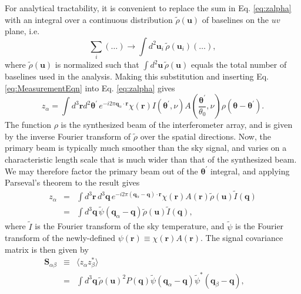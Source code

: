 \documentclass[twocolumn,aps,prd,nofootinbib,showpacs]{revtex4-1}
\begin{document}
For analytical tractability, it is convenient to replace the sum in Eq. \eqref{eq:zalpha} with an integral over a  continuous distribution $ \tilde{\rho} (\mathbf{u})$ of baselines on the $uv$ plane, i.e.
\begin{equation}
\sum_i  ( \dots ) \rightarrow \int d^2 \mathbf{u}_i \, \tilde{\rho} (\mathbf{u}_i)  ( \dots ),
\end{equation}
where $ \tilde{\rho} (\mathbf{u})$ is normalized such that $\int d^2 \mathbf{u} \, \tilde{\rho} (\mathbf{u}) $ equals the total number of baselines used in the analysis.  Making this substitution and inserting Eq. \eqref{eq:MeasurementEqn} into Eq. \eqref{eq:zalpha} gives
\begin{equation}
z_\alpha = \int d^3\mathbf{r}d^2 \boldsymbol \theta^\prime \, e^{-i 2\pi \mathbf{q}_\alpha \cdot \mathbf{r}} \chi (\mathbf{r})   I(\boldsymbol \theta^\prime, \nu) A \left(\frac{\boldsymbol \theta^\prime}{\theta_0}, \nu \right) 
\rho( \boldsymbol \theta - \boldsymbol \theta^\prime).
\end{equation}
The function $\rho$ is the synthesized beam of the interferometer array, and is given by the inverse Fourier transform of $\tilde{\rho}$ over the spatial directions.
Now, the primary beam is typically much smoother than the sky signal, and varies on a characteristic length scale that is much wider than that of the synthesized beam.  We may therefore factor the primary beam out of the $\boldsymbol \theta^\prime$ integral, and applying Parseval's theorem to the result gives
\begin{eqnarray}
z_\alpha &=& \int d^3 \mathbf{r} \,d^3 \mathbf{q}\, e^{-i 2 \pi (\mathbf{q}_\alpha - \mathbf{q}) \cdot \mathbf{r}} \chi (\mathbf{r}) A(\mathbf{r}) \tilde{\rho} (\mathbf{u}) \widetilde{I} (\mathbf{q}) \nonumber \\
&=&\int d^3 \mathbf{q}\, \widetilde{\psi}(\mathbf{q}_\alpha - \mathbf{q}) \tilde{\rho} (\mathbf{u}) \widetilde{I} (\mathbf{q}) ,
\end{eqnarray}
where $\widetilde{I}$ is the Fourier transform of the sky temperature, and $\widetilde{\psi}$ is the Fourier transform of the newly-defined $\psi (\mathbf{r}) \equiv \chi(\mathbf{r}) A(\mathbf{r})$.  The signal covariance matrix is then given by
\begin{eqnarray}
\label{eq:NotYetFactoredSab}
\mathbf{S}_{\alpha \beta} &\equiv& \langle z_\alpha z_\beta^* \rangle \nonumber \\
&=& \int d^3 \mathbf{q} \,\tilde{\rho} (\mathbf{u})^2 P(\mathbf{q}) \widetilde{\psi}(\mathbf{q}_\alpha - \mathbf{q}) \widetilde{\psi}^*(\mathbf{q}_\beta - \mathbf{q}), \qquad
\end{eqnarray}
\end{document}
